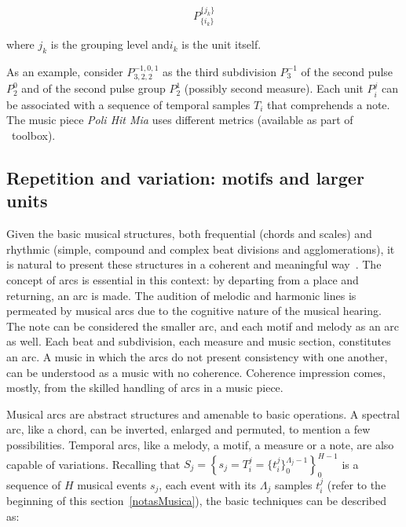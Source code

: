 \begin{equation}
P^{ \{ j_k \} }_{ \{ i_{k} \}}
\end{equation}

\noindent where $j_k$ is the grouping level and$i_k$ is the unit itself.

As an example, consider $P^{-1,0,1}_{3,2,2}$ as the third subdivision $P^{-1}_3$ of the
second pulse $P^0_2$ and of the second pulse group $P^1_2$ (possibly second measure). Each unit $P_i^j$ can be associated with a sequence of temporal samples $T_i$ that comprehends a
note. The music piece \emph{Poli Hit Mia} uses different metrics (available as part of \massa\ toolbox).


\subsection{Repetition and variation: motifs and larger units}\label{subsec:motivos}

Given the basic musical structures, both frequential (chords and scales) and rhythmic (simple, compound and complex beat divisions and agglomerations), it is
natural to present these structures in a coherent and meaningful way~\cite{Boulez}. The concept of arcs is essential in this context: by departing from a place and returning, an arc is made. The audition of melodic and harmonic lines is permeated by
musical arcs due to the cognitive nature of the musical hearing. 
The note can be considered the smaller arc, and each motif and melody as an arc as well.
Each beat and subdivision, each measure and music
section, constitutes an arc. A music in which the arcs do not present consistency with one another,
can be understood as a music with no coherence. Coherence impression
comes, mostly, from the skilled handling of arcs in a music piece.

Musical arcs are abstract structures and amenable to basic operations. A spectral arc, like a chord, can be inverted, enlarged and permuted, to mention a few possibilities. Temporal arcs, like a melody, a motif, a measure or a note, are also
capable of variations. Recalling that
$S_j=\left\{s_j=T_i^j=\{t_i^{j}\}_0^{\Lambda_j-1}\right\}_0^{H-1}$ is a sequence
of $H$ musical events $s_j$, each event with its $\Lambda_j$ samples $t_i^j$
(refer to the beginning of this section~\ref{notasMusica}), the basic techniques
can be described as:

